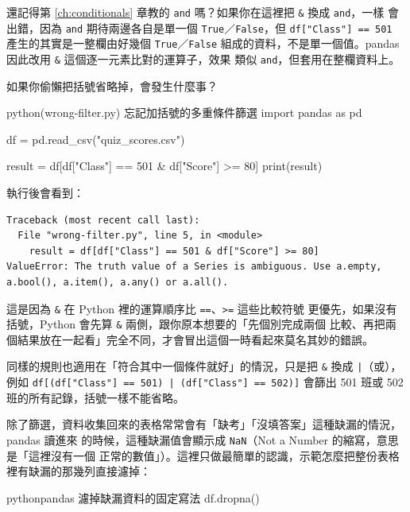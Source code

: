 還記得第 \ref{ch:conditionals} 章教的 \texttt{and} 嗎？如果你在這裡把 \texttt{\&} 換成 \texttt{and}，一樣
會出錯，因為 \texttt{and} 期待兩邊各自是單一個 \texttt{True}／\texttt{False}，但
\texttt{df["Class"] == 501} 產生的其實是一整欄由好幾個 \texttt{True}／\texttt{False}
組成的資料，不是單一個值。pandas 因此改用 \texttt{\&} 這個逐一元素比對的運算子，效果
類似 \texttt{and}，但套用在整欄資料上。

如果你偷懶把括號省略掉，會發生什麼事？

\begin{example}{python}{(wrong-filter.py) 忘記加括號的多重條件篩選}
import pandas as pd

df = pd.read_csv("quiz_scores.csv")

result = df[df["Class"] == 501 & df["Score"] >= 80]
print(result)
\end{example}

執行後會看到：

\begin{verbatim}
Traceback (most recent call last):
  File "wrong-filter.py", line 5, in <module>
    result = df[df["Class"] == 501 & df["Score"] >= 80]
ValueError: The truth value of a Series is ambiguous. Use a.empty,
a.bool(), a.item(), a.any() or a.all().
\end{verbatim}

這是因為 \texttt{\&} 在 Python 裡的運算順序比 \texttt{==}、\texttt{>=} 這些比較符號
更優先，如果沒有括號，Python 會先算 \texttt{\&} 兩側，跟你原本想要的「先個別完成兩個
比較、再把兩個結果放在一起看」完全不同，才會冒出這個一時看起來莫名其妙的錯誤。

同樣的規則也適用在「符合其中一個條件就好」的情況，只是把 \texttt{\&} 換成
\texttt{|}（或），例如 \texttt{df[(df["Class"] == 501) | (df["Class"] == 502)]} 會篩出
501 班或 502 班的所有記錄，括號一樣不能省略。


除了篩選，資料收集回來的表格常常會有「缺考」「沒填答案」這種缺漏的情況，pandas 讀進來
的時候，這種缺漏值會顯示成 \texttt{NaN}（Not a Number 的縮寫，意思是「這裡沒有一個
正常的數值」）。這裡只做最簡單的認識，示範怎麼把整份表格裡有缺漏的那幾列直接濾掉：

\begin{code}{python}{pandas 濾掉缺漏資料的固定寫法}
df.dropna()
\end{code}

